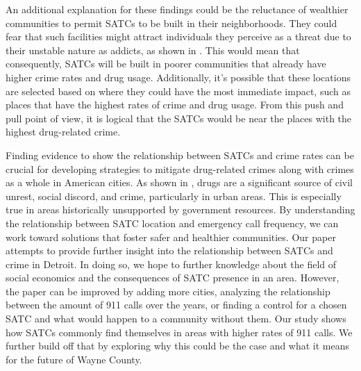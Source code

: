 \documentclass[12pt]{article}
\begin{document}
An additional explanation for these findings could be the reluctance of wealthier communities to permit SATCs to be built in their neighborhoods. They could fear that such facilities might attract individuals they perceive as a threat due to their unstable nature as addicts, as shown in \cite{mental_health_and_disability}. This would mean that consequently, SATCs will be built in poorer communities that already have higher crime rates and drug usage. Additionally, it's possible that these locations are selected based on where they could have the most immediate impact, such as places that have the highest rates of crime and drug usage. From this push and pull point of view, it is logical that the SATCs would be near the places with the highest drug-related crime.

Finding evidence to show the relationship between SATCs and crime rates can be crucial for developing strategies to mitigate drug-related crimes along with crimes as a whole in American cities. As shown in \cite{SAT_centers_and_crime}, drugs are a significant source of civil unrest, social discord, and crime, particularly in urban areas. This is especially true in areas historically unsupported by government resources. By understanding the relationship between SATC location and emergency call frequency, we can work toward solutions that foster safer and healthier communities. Our paper attempts to provide further insight into the relationship between SATCs and crime in Detroit. In doing so, we hope to further knowledge about the field of social economics and the consequences of SATC presence in an area. However, the paper can be improved by adding more cities, analyzing the relationship between the amount of 911 calls over the years, or finding a control for a chosen SATC and what would happen to a community without them. Our study shows how SATCs commonly find themselves in areas with higher rates of 911 calls. We further build off that by exploring why this could be the case and what it means for the future of Wayne County.
\end{document}
